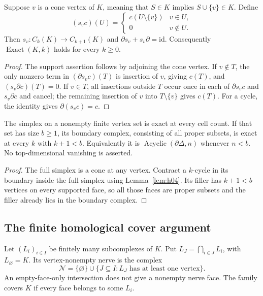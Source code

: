 \begin{lemma}\label{lem:h04}
Suppose \(v\) is a cone vertex of \(K\), meaning that
\(S\in K\) implies \(S\cup\{v\}\in K\). Define
\[
 (s_vc)(U)=\begin{cases}c(U\setminus\{v\})&v\in U,\\0&v\notin U.\end{cases}
\]
Then \(s_v:C_k(K)\to C_{k+1}(K)\) and
\(\partial s_v+s_v\partial=\mathrm{id}\). Consequently
\(\operatorname{Exact}(K,k)\) holds for every \(k\ge0\).
\end{lemma}
\begin{proof}
The support assertion follows by adjoining the cone vertex.
If \(v\notin T\), the only nonzero term in \((\partial s_vc)(T)\)
is insertion of \(v\), giving \(c(T)\), and \((s_v\partial c)(T)=0\).
If \(v\in T\), all insertions outside \(T\) occur once in each of
\(\partial s_vc\) and \(s_v\partial c\) and cancel; the remaining
insertion of \(v\) into \(T\setminus\{v\}\) gives \(c(T)\).
For a cycle, the identity gives \(\partial(s_vc)=c\).
\end{proof}

\begin{lemma}\label{lem:h05}
The simplex on a nonempty finite vertex set is exact at every cell count.
If that set has size \(b\ge1\), its boundary complex, consisting of all
proper subsets, is exact at every \(k\) with \(k+1<b\).
Equivalently it is \(\operatorname{Acyclic}(\partial\Delta,n)\) whenever
\(n<b\). No top-dimensional vanishing is asserted.
\end{lemma}
\begin{proof}
The full simplex is a cone at any vertex. Contract a \(k\)-cycle in its
boundary inside the full simplex using Lemma~\ref{lem:h04}. Its filler
has \(k+1<b\) vertices on every supported face, so all those faces are
proper subsets and the filler already lies in the boundary complex.
\end{proof}

\subsection{The finite homological cover argument}

Let \((L_i)_{i\in I}\) be finitely many subcomplexes of \(K\). Put
\(L_J=\bigcap_{i\in J}L_i\), with \(L_\varnothing=K\).
Its vertex-nonempty nerve is the complex
\[
 \mathcal N=\{\varnothing\}\cup
   \{J\subseteq I:L_J\text{ has at least one vertex}\}.
\]
An empty-face-only intersection does not give a nonempty nerve face.
The family covers \(K\) if every face belongs to some \(L_i\).

